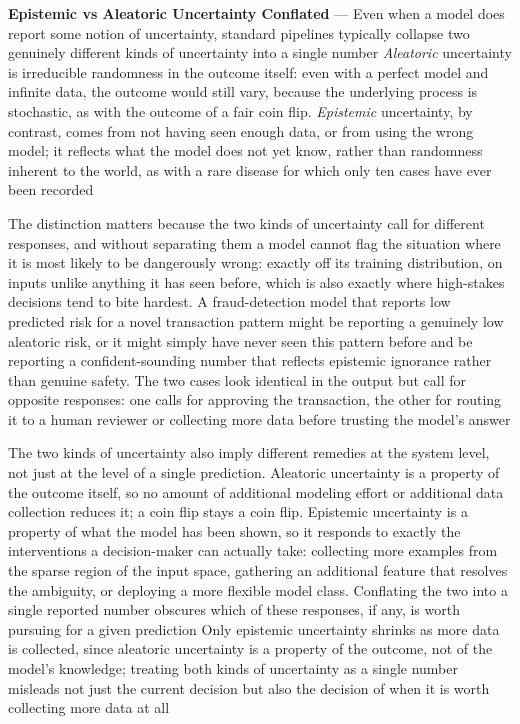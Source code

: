 \textbf{Epistemic vs Aleatoric Uncertainty Conflated} --- Even when a model does
report some notion of uncertainty, standard pipelines typically collapse two
genuinely different kinds of uncertainty into a single number \emph{Aleatoric} uncertainty
is irreducible randomness in the outcome itself: even with a perfect model and
infinite data, the outcome would still vary, because the underlying process is
stochastic, as with the outcome of a fair coin flip. \emph{Epistemic} uncertainty,
by contrast, comes from not having seen enough data, or from using the wrong model;
it reflects what the model does not yet know, rather than randomness inherent to the
world, as with a rare disease for which only ten cases have ever been recorded

The distinction matters because the two kinds of uncertainty call for different responses,
and without separating them a model cannot flag the situation where it is most
likely to be dangerously wrong: exactly off its training distribution, on inputs
unlike anything it has seen before, which is also exactly where high-stakes decisions
tend to bite hardest. A fraud-detection model that reports low predicted risk
for a novel transaction pattern might be reporting a genuinely low aleatoric
risk, or it might simply have never seen this pattern before and be reporting a confident-sounding
number that reflects epistemic ignorance rather than genuine safety. The two
cases look identical in the output but call for opposite responses: one calls for
approving the transaction, the other for routing it to a human reviewer or
collecting more data before trusting the model's answer

The two kinds of uncertainty also imply different remedies at the system level,
not just at the level of a single prediction. Aleatoric uncertainty is a property
of the outcome itself, so no amount of additional modeling effort or additional
data collection reduces it; a coin flip stays a coin flip. Epistemic uncertainty
is a property of what the model has been shown, so it responds to exactly the interventions
a decision-maker can actually take: collecting more examples from the sparse
region of the input space, gathering an additional feature that resolves the ambiguity,
or deploying a more flexible model class. Conflating the two into a single reported
number obscures which of these responses, if any, is worth pursuing for a given prediction
Only epistemic uncertainty shrinks as more data is collected, since aleatoric uncertainty
is a property of the outcome, not of the model's knowledge; treating both kinds of
uncertainty as a single number misleads not just the current decision but also the
decision of when it is worth collecting more data at all

